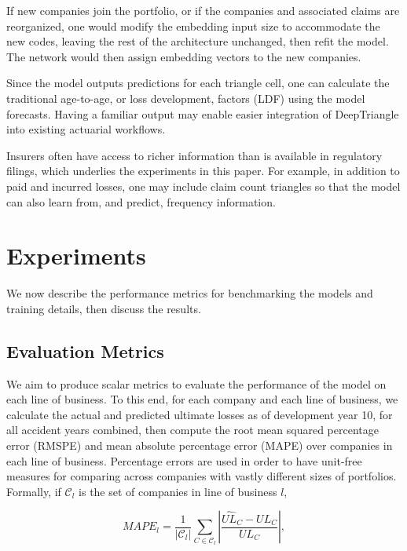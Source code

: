 \documentclass[risks,article,submit,moreauthors,pdftex]{mdpi}
\begin{document}
If new companies join the portfolio, or if the companies and associated claims are reorganized, one would modify the embedding input size to accommodate the new codes, leaving the rest of the architecture unchanged, then refit the model. The network would then assign embedding vectors to the new companies.

Since the model outputs predictions for each triangle cell, one can calculate the traditional age-to-age, or loss development, factors (LDF) using the model forecasts. Having a familiar output may enable easier integration of DeepTriangle into existing actuarial workflows.

Insurers often have access to richer information than is available in regulatory filings, which underlies the experiments in this paper. For example, in addition to paid and incurred losses, one may include claim count triangles so that the model can also learn from, and predict, frequency information.

\hypertarget{exps}{%
\section{Experiments}\label{exps}}

We now describe the performance metrics for benchmarking the models and training details, then discuss the results.

\hypertarget{evaluation-metrics}{%
\subsection{Evaluation Metrics}\label{evaluation-metrics}}

We aim to produce scalar metrics to evaluate the performance of the model on each line of business. To this end, for each company and each line of business, we calculate the actual and predicted ultimate losses as of development year 10, for all accident years combined, then compute the root mean squared percentage error (RMSPE) and mean absolute percentage error (MAPE) over companies in each line of business. Percentage errors are used in order to have unit-free measures for comparing across companies with vastly different sizes of portfolios. Formally, if \(\mathcal{C}_l\) is the set of companies in line of business \(l\),

\begin{equation}
MAPE_l = \frac{1}{|\mathcal{C}_l|}\sum_{C\in\mathcal{C}_l}\left|\frac{\widehat{UL}_C - UL_C}{UL_C}\right|,
\end{equation}
\end{document}
